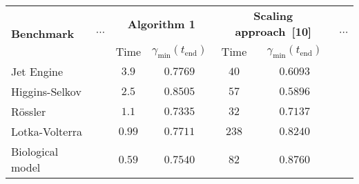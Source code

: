 

\begin{footnotesize}
\begin{tabular}{l c c c c c c}
    \toprule
    \multirow{2}{*}{\textbf{Benchmark}} & \multirow{2}{*}{$\cdots$} & \multicolumn{2}{c}{\textbf{Algorithm 1}} & \multicolumn{2}{c}{\textbf{Scaling approach~[10]}} & \multirow{2}{*}{$\cdots$} \\
    & & Time & $\gamma_{\min}(t_{\text{end}})$ & Time & $\gamma_{\min}(t_{\text{end}})$ & \\ \midrule
    Jet Engine & & $\mathbf{3.9}$ & $\mathbf{0.7769}$ & $40$ & $0.6093$ & \\
    Higgins-Selkov & & $\mathbf{2.5}$ & $\mathbf{0.8505}$ & $57$ & $0.5896$ & \\
    Rössler & & $\mathbf{1.1}$ & $\mathbf{0.7335}$ & $32$ & $0.7137$ & \\
    Lotka-Volterra & & $\mathbf{0.99}$ & $0.7711$ & $238$ & $\mathbf{0.8240}$ & \\
    Biological model & & $\mathbf{0.59}$ & $0.7540$ & $82$ & $0.8760$ & \\
    \bottomrule
\end{tabular}
\end{footnotesize}